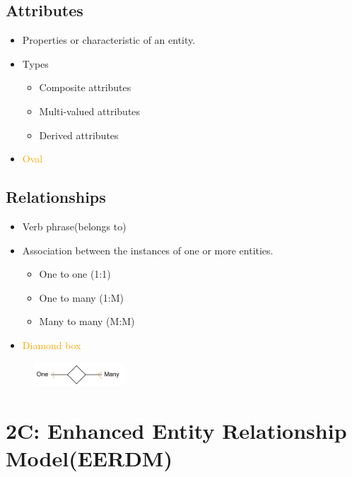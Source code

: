\documentclass[a4paper, 12pt]{article}
\begin{document}
    \subsection{Attributes}
        \begin{itemize}
            \item Properties or characteristic of an entity.
            \item Types
            \begin{itemize}
                \item Composite attributes
                \item Multi-valued attributes
                \item Derived attributes
            \end{itemize}
            \item \textcolor{orange}{Oval}
        \end{itemize}
    \subsection{Relationships}
    \begin{itemize}
        \item Verb phrase(belongs to)
        \item Association between the instances of one or more entities.
        \begin{itemize}
            \item One to one (1:1)
            \item One to many (1:M)
            \item Many to many (M:M)
        \end{itemize}
        \item \textcolor{orange}{Diamond box}
    \end{itemize}
    \begin{figure}[H]
        \includegraphics[width=0.3\textwidth]{chapter1a_15.png}
    \end{figure}

\newpage
\section{2C: Enhanced Entity Relationship Model(EERDM)}
\end{document}
